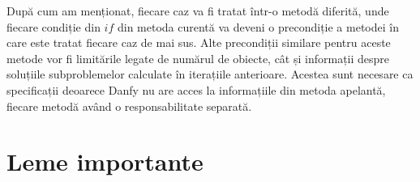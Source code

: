 \begin{sloppypar}
\begin{itemize}
    \end{itemize}
    După cum am menționat, fiecare caz va fi tratat într-o metodă diferită, unde fiecare condiție din $if$ din metoda curentă va deveni o precondiție a metodei în care este tratat fiecare caz de mai sus. Alte precondiții similare pentru aceste metode vor fi limitările legate de numărul de obiecte, cât și informații despre soluțiile subproblemelor calculate în iterațiile anterioare. Acestea sunt necesare ca specificații deoarece Danfy nu are acces la informațiile din metoda apelantă, fiecare metodă având o responsabilitate separată.
    
\section{Leme importante}


\end{sloppypar}
